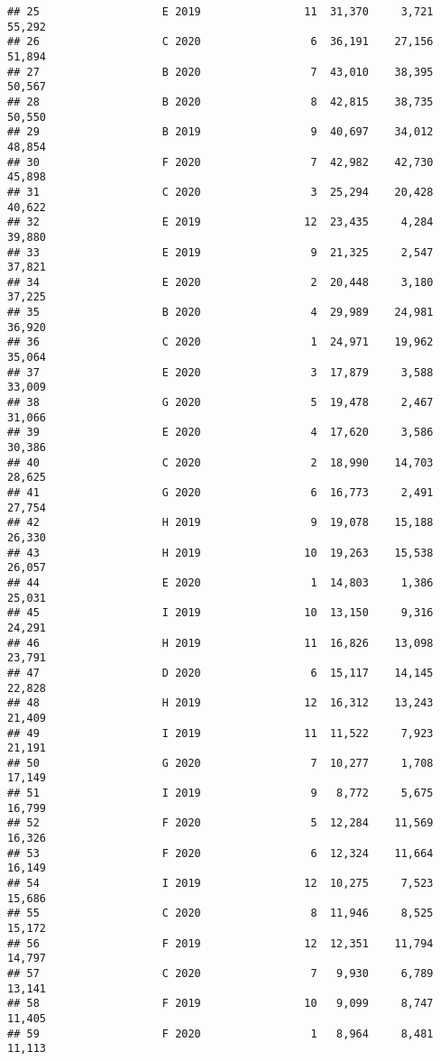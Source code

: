 \documentclass[
]{article}
\begin{document}
\begin{verbatim}
## 25                   E 2019                11  31,370     3,721   55,292
## 26                   C 2020                 6  36,191    27,156   51,894
## 27                   B 2020                 7  43,010    38,395   50,567
## 28                   B 2020                 8  42,815    38,735   50,550
## 29                   B 2019                 9  40,697    34,012   48,854
## 30                   F 2020                 7  42,982    42,730   45,898
## 31                   C 2020                 3  25,294    20,428   40,622
## 32                   E 2019                12  23,435     4,284   39,880
## 33                   E 2019                 9  21,325     2,547   37,821
## 34                   E 2020                 2  20,448     3,180   37,225
## 35                   B 2020                 4  29,989    24,981   36,920
## 36                   C 2020                 1  24,971    19,962   35,064
## 37                   E 2020                 3  17,879     3,588   33,009
## 38                   G 2020                 5  19,478     2,467   31,066
## 39                   E 2020                 4  17,620     3,586   30,386
## 40                   C 2020                 2  18,990    14,703   28,625
## 41                   G 2020                 6  16,773     2,491   27,754
## 42                   H 2019                 9  19,078    15,188   26,330
## 43                   H 2019                10  19,263    15,538   26,057
## 44                   E 2020                 1  14,803     1,386   25,031
## 45                   I 2019                10  13,150     9,316   24,291
## 46                   H 2019                11  16,826    13,098   23,791
## 47                   D 2020                 6  15,117    14,145   22,828
## 48                   H 2019                12  16,312    13,243   21,409
## 49                   I 2019                11  11,522     7,923   21,191
## 50                   G 2020                 7  10,277     1,708   17,149
## 51                   I 2019                 9   8,772     5,675   16,799
## 52                   F 2020                 5  12,284    11,569   16,326
## 53                   F 2020                 6  12,324    11,664   16,149
## 54                   I 2019                12  10,275     7,523   15,686
## 55                   C 2020                 8  11,946     8,525   15,172
## 56                   F 2019                12  12,351    11,794   14,797
## 57                   C 2020                 7   9,930     6,789   13,141
## 58                   F 2019                10   9,099     8,747   11,405
## 59                   F 2020                 1   8,964     8,481   11,113

\end{verbatim}
\end{document}
